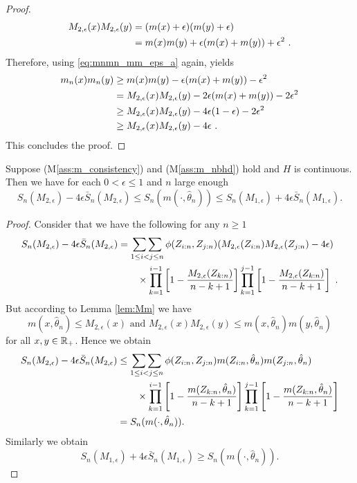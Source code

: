 \begin{lemma}
\begin{proof}
		\begin{align*}
			M_{2,\epsilon}(x)M_{2,\epsilon}(y) &= (m(x) +\epsilon)(m(y) + \epsilon)\\
			&= m(x)m(y) + \epsilon(m(x) + m(y)) + \epsilon^2\textrm{ .}
		\end{align*}
		Therefore, using \eqref{eq:mnmn_mm_eps_a} again, yields
		\begin{align*}
			m_n(x)m_n(y) &\geq m(x)m(y) - \epsilon(m(x) + m(y)) - \epsilon^2\\
			&= M_{2,\epsilon}(x) M_{2,\epsilon}(y) - 2\epsilon(m(x) + m(y)) - 2\epsilon^2\\
			&\geq M_{2,\epsilon}(x) M_{2,\epsilon}(y) - 4\epsilon(1-\epsilon) - 2\epsilon^2\\
			&\geq M_{2,\epsilon}(x) M_{2,\epsilon}(y) - 4\epsilon \textrm{ .}
		\end{align*}
		This concludes the proof.
	\end{proof}
\end{lemma}

\begin{cor}
	Suppose (M\ref{ass:m_consistency}) and (M\ref{ass:m_nbhd}) hold and $H$ is continuous. Then we have for each $0 < \epsilon \leq 1$ and $n$ large enough
	$$S_n(M_{2,\epsilon}) - 4\epsilon \bar{S}_n(M_{2,\epsilon}) \leq S_n(m(\cdot, \hat\theta_n)) \leq S_n(M_{1,\epsilon}) + 4\epsilon \bar{S}_n(M_{1,\epsilon})\textrm{.}$$
	\label{lem:sandwich}
	\begin{proof}
		Consider that we have the following for any $n\geq 1$
		\begin{align*}
			S_n(M_{2,\epsilon}) - 4\epsilon \bar{S}_n(M_{2,\epsilon}) &= \mathop{\sum\sum}\limits_{1\leq i<j\leq n} \phi(Z_{i:n}, Z_{j:n}) (M_{2,\epsilon}(Z_{i:n}) M_{2,\epsilon}(Z_{j:n}) - 4\epsilon) \\
			&\qquad \times \prod_{k=1}^{i-1}\left[1-\frac{M_{2,\epsilon}(Z_{k:n})}{n-k+1}\right] \prod_{k=1}^{j-1}\left[1-\frac{M_{2,\epsilon}(Z_{k:n})}{n-k+1}\right]\textrm{ .}
		\end{align*}
		But according to Lemma \ref{lem:Mm} we have 
		$$m(x,\hat\theta_n) \leq M_{2,\epsilon}(x) \textrm{ and } M_{2,\epsilon}(x)M_{2,\epsilon}(y) \leq m(x,\hat\theta_n)m(y,\hat\theta_n)$$
		for all $x,y \in \mathbb{R}_+$. Hence we obtain
		\begin{align*}
		S_n(M_{2,\epsilon}) - 4\epsilon \bar{S}_n(M_{2,\epsilon}) &\leq \mathop{\sum\sum}\limits_{1\leq i<j\leq n} \phi(Z_{i:n}, Z_{j:n}) m(Z_{i:n},\hat\theta_n)m(Z_{j:n},\hat\theta_n) \\
		&\qquad \times \prod_{k=1}^{i-1}\left[1-\frac{m(Z_{k:n},\hat\theta_n)}{n-k+1}\right] \prod_{k=1}^{j-1}\left[1-\frac{m(Z_{k:n},\hat\theta_n)}{n-k+1}\right]\\
		&= S_n(m(\cdot, \hat\theta_n))\textrm{.}
		\end{align*}
		Similarly we obtain 
		$$S_n(M_{1,\epsilon}) + 4\epsilon \bar{S}_n(M_{1,\epsilon}) \geq S_n(m(\cdot, \hat\theta_n)) \textrm{.}$$
	\end{proof}
\end{cor}

